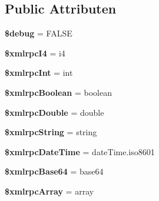 \subsection*{Public Attributen}
\begin{DoxyCompactItemize}
\item 
\mbox{\label{class_c_i___xmlrpc_a85ae3e64cd40e9564adceb010085e9dd}} 
{\bfseries \$debug} = F\+A\+L\+SE
\item 
\mbox{\label{class_c_i___xmlrpc_a4d41d61a02c60406c56254f0988b8141}} 
{\bfseries \$xmlrpc\+I4} = \textquotesingle{}i4\textquotesingle{}
\item 
\mbox{\label{class_c_i___xmlrpc_a1bf451bf41226cf1702f54fa46b041f2}} 
{\bfseries \$xmlrpc\+Int} = \textquotesingle{}int\textquotesingle{}
\item 
\mbox{\label{class_c_i___xmlrpc_abb241cb9cac2595c7ef28106808ec438}} 
{\bfseries \$xmlrpc\+Boolean} = \textquotesingle{}boolean\textquotesingle{}
\item 
\mbox{\label{class_c_i___xmlrpc_aa412c6bea7572d0e508b5ef9d2213db3}} 
{\bfseries \$xmlrpc\+Double} = \textquotesingle{}double\textquotesingle{}
\item 
\mbox{\label{class_c_i___xmlrpc_a69f8b2c87014597d1f5509ec934ceeea}} 
{\bfseries \$xmlrpc\+String} = \textquotesingle{}string\textquotesingle{}
\item 
\mbox{\label{class_c_i___xmlrpc_ad0ef2c8353643b73afe4636a5fb84cff}} 
{\bfseries \$xmlrpc\+Date\+Time} = \textquotesingle{}date\+Time.\+iso8601\textquotesingle{}
\item 
\mbox{\label{class_c_i___xmlrpc_a95dc3164d1c3e1fdaf7185095fb376ae}} 
{\bfseries \$xmlrpc\+Base64} = \textquotesingle{}base64\textquotesingle{}
\item 
\mbox{\label{class_c_i___xmlrpc_aedecd71f2438e9a44a8f5a1dc73f4c7a}} 
{\bfseries \$xmlrpc\+Array} = \textquotesingle{}array\textquotesingle{}
\item 
\mbox{\label{class_c_i___xmlrpc_a9a499285050ed5c867eec71854231f01}} 

\end{DoxyCompactItemize}

